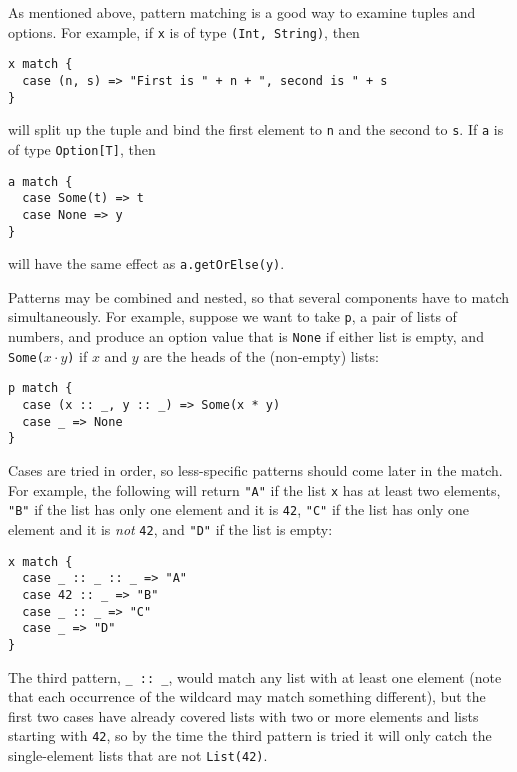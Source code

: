 \documentclass[11pt]{article}
\begin{document}
As mentioned above, pattern matching is a good way to examine tuples and options. For example, if \texttt{x} is of type \texttt{(Int, String)}, then
\begin{verbatim}
x match {
  case (n, s) => "First is " + n + ", second is " + s
}
\end{verbatim}
will split up the tuple and bind the first element to \texttt{n} and the second to \texttt{s}. If \texttt{a} is of type \texttt{Option[T]}, then
\begin{verbatim}
a match {
  case Some(t) => t
  case None => y
}
\end{verbatim}
will have the same effect as \texttt{a.getOrElse(y)}.

Patterns may be combined and nested, so that several components have to match simultaneously. For example, suppose we want to take \texttt{p}, a pair of lists of numbers, and produce an option value that is \texttt{None} if either list is empty, and \texttt{Some($x\cdot y$)} if $x$ and $y$ are the heads of the (non-empty) lists:
\begin{verbatim}
p match {
  case (x :: _, y :: _) => Some(x * y)
  case _ => None
}
\end{verbatim}
Cases are tried in order, so less-specific patterns should come later in the match. For example, the following will return \verb|"A"| if the list \texttt{x} has at least two elements, \verb|"B"| if the list has only one element and it is \texttt{42}, \verb|"C"| if the list has only one element and it is \emph{not} \texttt{42}, and \verb|"D"| if the list is empty:
\begin{verbatim}
x match {
  case _ :: _ :: _ => "A"
  case 42 :: _ => "B"
  case _ :: _ => "C"
  case _ => "D"
}
\end{verbatim}
The third pattern, \verb|_ :: _|, would match any list with at least one element (note that each occurrence of the wildcard may match something different), but the first two cases have already covered lists with two or more elements and lists starting with \texttt{42}, so by the time the third pattern is tried it will only catch the single-element lists that are not \texttt{List(42)}.
\end{document}

